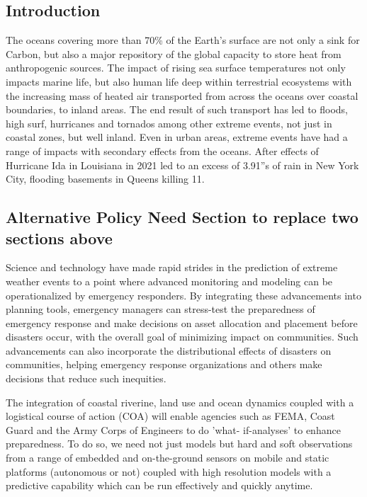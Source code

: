 \subsection*{Introduction}

The oceans covering more than 70\% of the Earth's surface are not only
a sink for Carbon, but also a major repository of the global capacity
to store heat from anthropogenic sources. The impact of rising sea
surface temperatures not only impacts marine life, but also human life
deep within terrestrial ecosystems with the increasing mass of heated
air transported from across the oceans over coastal boundaries, to
inland areas. The end result of such transport has led to floods, high
surf, hurricanes and tornados among other extreme events, not just in
coastal zones, but well inland. Even in urban areas, extreme events
have had a range of impacts with secondary effects from the
oceans. After effects of Hurricane Ida in Louisiana in 2021 led to an
excess of 3.91''s of rain in New York City, flooding basements in
Queens killing 11.

\subsection{Alternative Policy Need Section to replace two sections above}
Science and technology have made rapid strides in the prediction of extreme weather events to a point where advanced monitoring and modeling can be operationalized by emergency responders. By integrating these advancements into planning tools, emergency managers can stress-test the preparedness of emergency response and make decisions on asset allocation and placement before disasters occur, with the overall goal of minimizing impact on communities. Such advancements can also incorporate the distributional effects of disasters on communities, helping emergency response organizations and others make decisions that reduce such inequities.


The integration of coastal riverine, land use and ocean dynamics coupled with a logistical course of action (COA) will enable agencies such as FEMA, Coast Guard and the Army Corps of Engineers to do ’what- if-analyses’ to enhance preparedness. To do so, we need not just models but hard and soft observations from a range of embedded and on-the-ground sensors on mobile and static platforms (autonomous or not) coupled with high resolution models with a predictive capability which can be run effectively and quickly anytime. 



